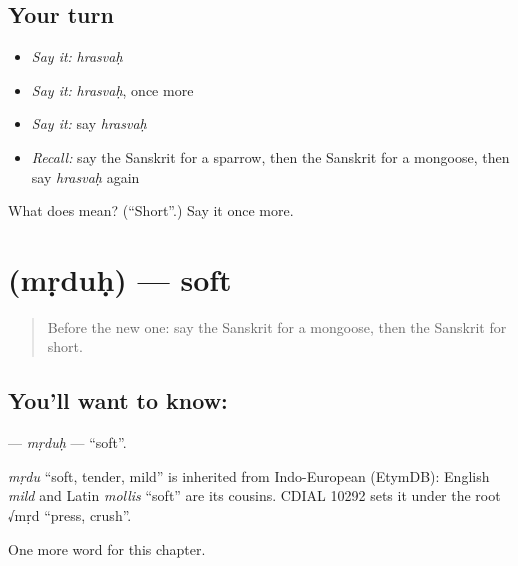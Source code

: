 \subsection*{Your turn}
\begin{itemize}
\raggedright
  \item \emph{Say it:} \emph{hrasvaḥ}
  \item \emph{Say it:} \emph{hrasvaḥ}, once more
  \item \emph{Say it:} say \emph{hrasvaḥ}
  \item \emph{Recall:} say the Sanskrit for a sparrow, then the Sanskrit for a mongoose, then say \emph{hrasvaḥ} again
\end{itemize}

\begin{tcolorbox}[breakable,colback=teal!4,colframe=teal!35!black,title={Before you move on}]
What does  mean? (\textquotedblleft{}Short\textquotedblright{}.) Say it once more.
\end{tcolorbox}
\section[\texorpdfstring{\sk{मृदुः} (mṛduḥ)}{मृदुः (mṛduḥ)}]{ (mṛduḥ) — soft}

\label{lesson:SA-C125-mrduh}



\begin{quote}
Before the new one: say the Sanskrit for a mongoose, then the Sanskrit for short.
\end{quote}

\subsection*{You'll want to know: }
\textbf{} — \emph{mṛduḥ} — \textquotedblleft{}soft\textquotedblright{}.

\begin{cousinweb}
\emph{mṛdu} \textquotedblleft{}soft, tender, mild\textquotedblright{} is inherited from Indo-European (EtymDB): English \emph{mild} and Latin \emph{mollis} \textquotedblleft{}soft\textquotedblright{} are its cousins. CDIAL 10292 sets it under the root √mṛd \textquotedblleft{}press, crush\textquotedblright{}.
\end{cousinweb}

\begin{grammarlens}[title={What you've built}]
One more word for this chapter.
\end{grammarlens}

